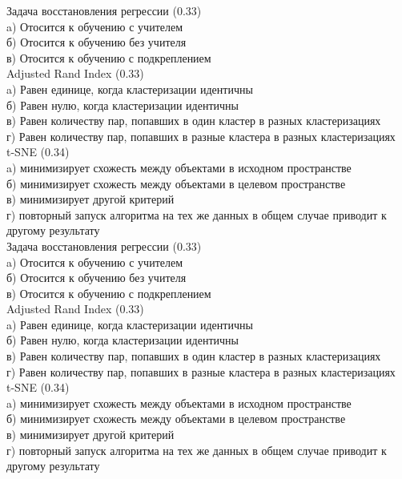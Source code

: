 \documentclass[10pt,a4paper]{article}
\author{Nikolay Anokhin}
\begin{document}
\thispagestyle{empty}

\noindent Задача восстановления регрессии (0.33) \\
a) Отосится к обучению с учителем \\
б) Отосится к обучению без учителя \\
в) Отосится к обучению с подкреплением \\

\noindent Adjusted Rand Index (0.33) \\
a) Равен единице, когда кластеризации идентичны \\
б) Равен нулю, когда кластеризации идентичны \\
в) Равен количеству пар, попавших в один кластер в разных кластеризациях \\
г) Равен количеству пар, попавших в разные кластера в разных кластеризациях \\

\noindent t-SNE (0.34) \\
a) минимизирует схожесть между объектами в исходном пространстве \\
б) минимизирует схожесть между объектами в целевом пространстве \\
в) минимизирует другой критерий \\
г) повторный запуск алгоритма на тех же данных в общем случае приводит к другому результату \\

\vspace{1em}
\noindent Задача восстановления регрессии (0.33) \\
a) Отосится к обучению с учителем \\
б) Отосится к обучению без учителя \\
в) Отосится к обучению с подкреплением \\

\noindent Adjusted Rand Index (0.33) \\
a) Равен единице, когда кластеризации идентичны \\
б) Равен нулю, когда кластеризации идентичны \\
в) Равен количеству пар, попавших в один кластер в разных кластеризациях \\
г) Равен количеству пар, попавших в разные кластера в разных кластеризациях \\

\noindent t-SNE (0.34) \\
a) минимизирует схожесть между объектами в исходном пространстве \\
б) минимизирует схожесть между объектами в целевом пространстве \\
в) минимизирует другой критерий \\
г) повторный запуск алгоритма на тех же данных в общем случае приводит к другому результату \\
\end{document}
